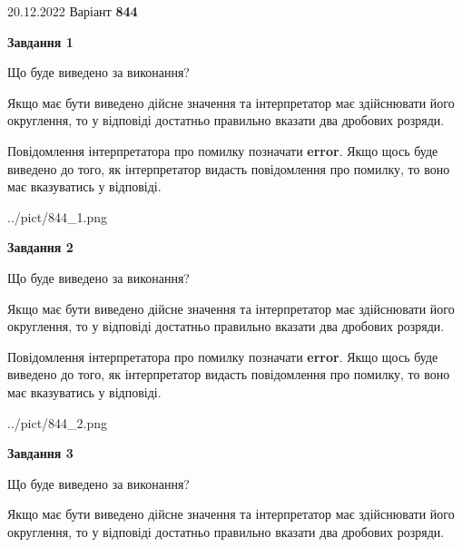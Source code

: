 \documentclass[12pt, ukrainian]{article}
\begin{document}
{20.12.2022 Варіант \No \textbf { 844 }\par}
{
\begin {Large}

{\begin {center}\textbf{Завдання 1}\end {center}}\par
Що буде виведено за виконання? \par

Якщо має бути виведено дійсне значення та інтерпретатор має здійснювати його округлення, 
то у відповіді достатньо правильно вказати два дробових розряди.

Повідомлення інтерпретатора про помилку позначати \textbf{error}.
Якщо щось буде виведено до того, як інтерпретатор видасть повідомлення про помилку, 
то воно має вказуватись у відповіді. \par

\begin{center}
	{../pict/844_1.png}
\end{center}
\newpage

{\begin {center}\textbf{Завдання 2}\end {center}}\par
Що буде виведено за виконання? \par

Якщо має бути виведено дійсне значення та інтерпретатор має здійснювати його округлення, 
то у відповіді достатньо правильно вказати два дробових розряди.

Повідомлення інтерпретатора про помилку позначати \textbf{error}.
Якщо щось буде виведено до того, як інтерпретатор видасть повідомлення про помилку, 
то воно має вказуватись у відповіді. \par

\begin{center}
	{../pict/844_2.png}
\end{center}
\newpage

{\begin {center}\textbf{Завдання 3}\end {center}}\par
Що буде виведено за виконання? \par

Якщо має бути виведено дійсне значення та інтерпретатор має здійснювати його округлення, 
то у відповіді достатньо правильно вказати два дробових розряди.


\end{Large}}
\end{document}
